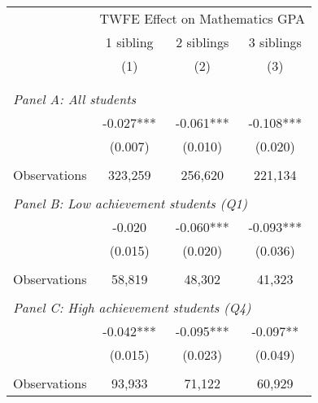\makeatletter
{}
{
\makeatother
\begin{tabular}{lccc}
\toprule
\cmidrule(lr){2-4}
& \multicolumn{3}{c}{TWFE Effect on Mathematics GPA} \\
\cmidrule(lr){2-4}
& 1 sibling & 2 siblings & 3 siblings  \\
\cmidrule(lr){2-2} \cmidrule(lr){3-3} \cmidrule(lr){4-4}
& (1) & (2) & (3)\\
\bottomrule
&  &  &  \\
&  &  &   \\
\multicolumn{4}{l}{\textit{Panel A: All students}} \\
\hspace{3mm}        &      -0.027***&      -0.061***&      -0.108***\\
                    &     (0.007)   &     (0.010)   &     (0.020)   \\
                    &               &               &               \\
\hspace{3mm}Observations&     323,259   &     256,620   &     221,134   \\
 
&  &  &   \\
\multicolumn{4}{l}{\textit{Panel B: Low achievement students (Q1)}} \\
\hspace{3mm}        &      -0.020   &      -0.060***&      -0.093***\\
                    &     (0.015)   &     (0.020)   &     (0.036)   \\
                    &               &               &               \\
\hspace{3mm}Observations&      58,819   &      48,302   &      41,323   \\
 
&  &  &   \\
\multicolumn{4}{l}{\textit{Panel C: High achievement students (Q4)}} \\
\hspace{3mm}        &      -0.042***&      -0.095***&      -0.097** \\
                    &     (0.015)   &     (0.023)   &     (0.049)   \\
                    &               &               &               \\
\hspace{3mm}Observations&      93,933   &      71,122   &      60,929   \\
 

\end{tabular}}
